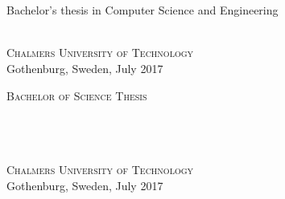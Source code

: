 
\begin{titlepage}
			
\addtolength{\voffset}{2cm}


\mbox{}
\vfill
\renewcommand{\familydefault}{\sfdefault} \normalfont %
\textbf{{\Huge{}\varHeadline}} 	\\[0.5cm]
{\Large \varSubtitle}\\[0.5cm] Bachelor's thesis in Computer Science and Engineering \setlength{\parskip}{1cm}

{\Large \varNames} \setlength{\parskip}{2.9cm}

\varDepartment \\
\textsc{Chalmers University of Technology} \\
Gothenburg, Sweden, July 2017

\renewcommand{\familydefault}{\rmdefault} \normalfont %
\end{titlepage}

\newpage
\thispagestyle{empty}
\begin{center}
	\textsc{\large Bachelor of Science Thesis}\\[4cm]		%
	\textbf{\Large \varHeadline} \\[1cm]
	{\large \varSubtitle}\\[1cm]
	{\large \varNames}
	
	\vfill	
	
	\varDepartment \\
	\textsc{Chalmers University of Technology} \\
	Gothenburg, Sweden, July 2017 \\
\end{center}


